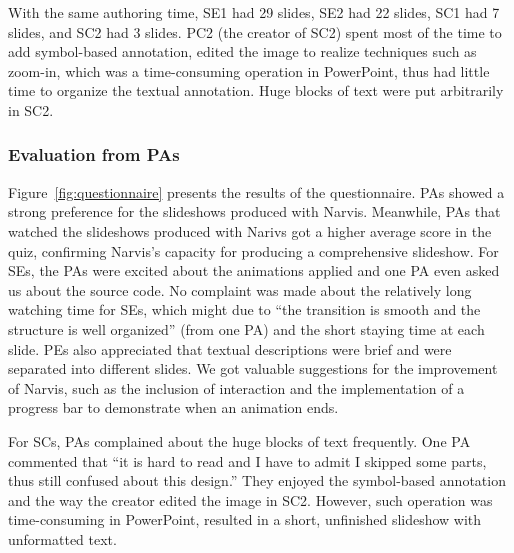 With the same authoring time, SE1 had 29 slides, SE2 had 22 slides, SC1 had 7 slides, and SC2 had 3 slides. PC2 (the creator of SC2) spent most of the time to add symbol-based annotation, edited the image to realize techniques such as zoom-in, which was a time-consuming operation in PowerPoint, thus had little time to organize the textual annotation. Huge blocks of text were put arbitrarily in SC2.



\subsubsection{Evaluation from PAs}

Figure~\ref{fig:questionnaire} presents the results of the questionnaire. PAs showed a strong preference for the slideshows produced with Narvis. Meanwhile,  PAs that watched the slideshows produced with Narivs got a higher average score in the quiz, confirming Narvis's capacity for producing a comprehensive slideshow. 
For SEs, the PAs were excited about the animations applied and one PA even asked us about the source code. No complaint was made about the relatively long watching time for SEs, which might due to ``the transition is smooth and the structure is well organized'' (from one PA) and the short staying time at each slide. PEs also appreciated that textual descriptions were brief and were separated into different slides.
We got valuable suggestions for the improvement of Narvis, such as the inclusion of interaction and the implementation of a progress bar to demonstrate when an animation ends. 

For SCs, PAs complained about the huge blocks of text frequently. 
One PA commented that ``it is hard to read and I have to admit I skipped some parts, thus still confused about this design.'' They enjoyed the symbol-based annotation and the way the creator edited the image in SC2. However, such operation was time-consuming in PowerPoint, resulted in a short, unfinished slideshow with unformatted text. 


